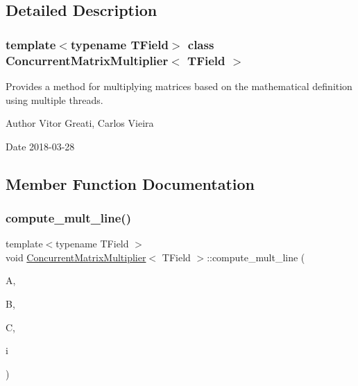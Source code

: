 \subsection{Detailed Description}
\subsubsection*{template$<$typename T\+Field$>$\newline
class Concurrent\+Matrix\+Multiplier$<$ T\+Field $>$}

Provides a method for multiplying matrices based on the mathematical definition using multiple threads. 

\begin{DoxyAuthor}{Author}
Vitor Greati, Carlos Vieira 
\end{DoxyAuthor}
\begin{DoxyDate}{Date}
2018-\/03-\/28 
\end{DoxyDate}


\subsection{Member Function Documentation}
\mbox{\label{classConcurrentMatrixMultiplier_ad712a4f89999ea327367f88502bc90d7}} 
\subsubsection{\texorpdfstring{compute\+\_\+mult\+\_\+line()}{compute\_mult\_line()}}
{\footnotesize\ttfamily template$<$typename T\+Field $>$ \\
void \mbox{\hyperlink{classConcurrentMatrixMultiplier}{Concurrent\+Matrix\+Multiplier}}$<$ T\+Field $>$\+::compute\+\_\+mult\+\_\+line (\begin{DoxyParamCaption}\item[{const \mbox{\hyperlink{classMatrix}{Matrix}}$<$ T\+Field $>$ \&}]{A,  }\item[{const \mbox{\hyperlink{classMatrix}{Matrix}}$<$ T\+Field $>$ \&}]{B,  }\item[{\mbox{\hyperlink{classMatrix}{Matrix}}$<$ T\+Field $>$ \&}]{C,  }\item[{const int \&}]{i }\end{DoxyParamCaption})\hspace{0.3cm}{\ttfamily [inline]}}



